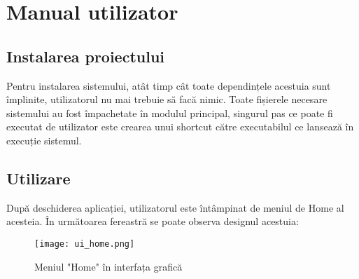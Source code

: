 
 \chapter{Manual utilizator}

\label{cap:user-manual}
%
%
%

\section{Instalarea proiectului}

Pentru instalarea sistemului, atât timp cât toate dependințele acestuia sunt împlinite, utilizatorul nu mai trebuie să facă nimic. Toate fișierele necesare sistemului au fost împachetate în modulul principal, singurul pas ce poate fi executat de utilizator este crearea unui shortcut către executabilul ce lansează în execuție sistemul. 
\section{Utilizare}

După deschiderea aplicației, utilizatorul este întâmpinat de meniul de Home al acesteia. În următoarea fereastră se poate observa designul acestuia:  

\begin{figure}[h]
	\centering
	\texttt{[image: ui\_home.png]}
	\caption{ Meniul "Home" în interfața grafică }
	\label{fig:8_ui_home}
\end{figure}

